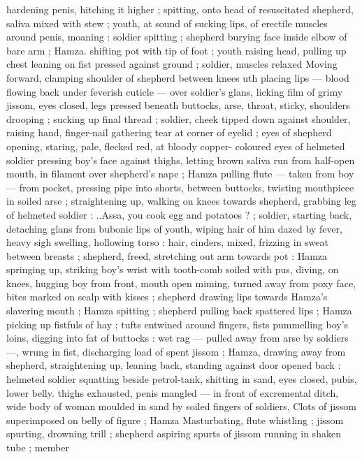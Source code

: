 {hardening penis, hitching it higher ; spitting, onto head of 
resuscitated shepherd, saliva mixed with stew ; youth, at sound of 
sucking lips, of erectile muscles around penis, moaning : soldier 
spitting ; shepherd burying face inside elbow of bare arm ; Hamza. 
shifting pot with tip of foot ; youth raising head, pulling up chest 
leaning on fist pressed against ground ; soldier, muscles relaxed 
Moving forward, clamping shoulder of shepherd between knees 
uth placing lips --- blood flowing back under feverish cuticle --- 
over soldier's glans, licking film of grimy jissom, eyes closed, legs 
pressed beneath buttocks, arse, throat, sticky, shoulders drooping ; 
sucking up final thread ; soldier, cheek tipped down against shoulder, 
raising hand, finger-nail gathering tear at corner of eyelid ; eyes of 
shepherd opening, staring, pale, flecked red, at bloody copper- 
coloured eyes of helmeted soldier pressing boy's face against 
thighs, letting brown saliva run from half-open mouth, in filament 
over shepherd's nape ; Hamza pulling flute --- taken from boy --- 
from pocket, pressing pipe into shorts, between buttocks, twisting 
mouthpiece in soiled arse ; straightening up, walking on knees 
towards shepherd, grabbing leg of helmeted soldier : {\gl}..Assa, you 
cook egg and potatoes ? {\gr} ; soldier, starting back, detaching glans 
from bubonic lips of youth, wiping hair of him dazed by fever, heavy 
sigh swelling, hollowing torso : hair, cinders, mixed, frizzing in sweat 
between breasts ; shepherd, freed, stretching out arm towards pot : 
Hamza springing up, striking boy's wrist with tooth-comb soiled with 
pus, diving, on knees, hugging boy from front, mouth open miming, 
turned away from poxy face, bites marked on scalp with kisses ; 
shepherd drawing lips towards Hamza's slavering mouth ; Hamza 
spitting ; shepherd pulling back spattered lips ; Hamza picking up 
fistfuls of hay ; tufts entwined around fingers, fists pummelling boy's 
loins, digging into fat of buttocks : wet rag --- pulled away from arse 
by soldiers ---, wrung in fist, discharging load of spent jissom ; 
Hamza, drawing away from shepherd, straightening up, leaning back, 
standing against door opened back : helmeted soldier squatting 
beside petrol-tank, shitting in sand, eyes closed, pubis, lower belly. 
thighs exhausted, penis mangled --- in front of excremental ditch, 
wide body of woman moulded in sand by soiled fingers of soldiers, 
Clots of jissom superimposed on belly of figure ; Hamza 
Masturbating, flute whistling ; jissom spurting, drowning trill ; 
shepherd aspiring spurts of jissom running in shaken tube ; member 
}
